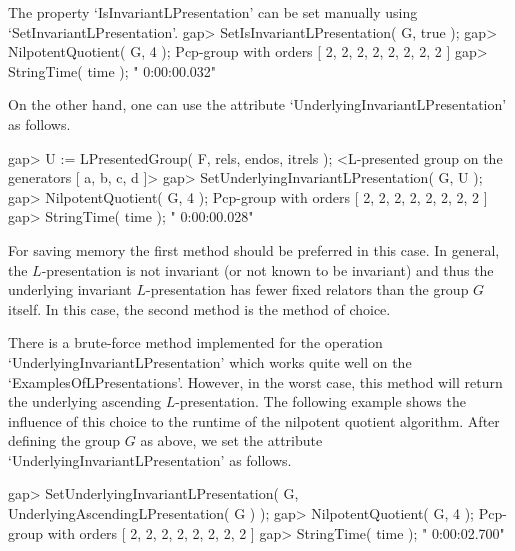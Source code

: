 The property `IsInvariantLPresentation' can be set manually using
`SetInvariantLPresentation'.
\beginexample
gap> SetIsInvariantLPresentation( G, true );
gap> NilpotentQuotient( G, 4 );
Pcp-group with orders [ 2, 2, 2, 2, 2, 2, 2, 2 ]
gap> StringTime( time );
" 0:00:00.032"
\endexample

On the other hand, one can use the attribute
`UnderlyingInvariantLPresentation' as follows.

\beginexample
gap> U := LPresentedGroup( F, rels, endos, itrels );
<L-presented group on the generators [ a, b, c, d ]>
gap> SetUnderlyingInvariantLPresentation( G, U );
gap> NilpotentQuotient( G, 4 );
Pcp-group with orders [ 2, 2, 2, 2, 2, 2, 2, 2 ]
gap> StringTime( time );
" 0:00:00.028"
\endexample

For saving memory the first method should be preferred in this case. In
general, the $L$-presentation is not invariant (or not known to be
invariant) and thus the underlying invariant $L$-presentation has fewer
fixed relators than the group $G$ itself. In this case, the second method
is the method of choice.

There is a brute-force method implemented for the operation
`UnderlyingInvariantLPresentation' which works quite well on the
`ExamplesOfLPresentations'. However, in the worst case, this method will
return the underlying ascending $L$-presentation. The following example
shows the influence of this choice to the runtime of the nilpotent
quotient algorithm. After defining the group $G$ as above, we set the
attribute `UnderlyingInvariantLPresentation' as follows.

\beginexample
gap> SetUnderlyingInvariantLPresentation( G, UnderlyingAscendingLPresentation( G ) );
gap> NilpotentQuotient( G, 4 );
Pcp-group with orders [ 2, 2, 2, 2, 2, 2, 2, 2 ]
gap> StringTime( time );
" 0:00:02.700"
\endexample

